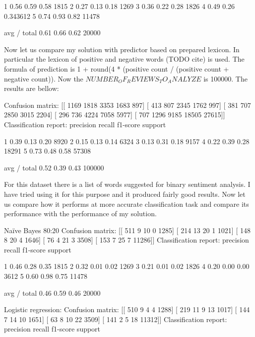 \documentclass[12pt]{report}
\begin{document}
1       0.56      0.59      0.58       1815
2       0.27      0.13      0.18       1269
3       0.36      0.22      0.28       1826
4       0.49      0.26      0.343612
5       0.74      0.93      0.82      11478

avg / total       0.61      0.66      0.62      20000

Now let us compare my solution with predictor based on prepared lexicon. In particular the lexicon of positive and negative words (TODO cite) is used. The formula of prediction is 1 + round(4 * (positive count / (positive count + negative count)). Now the $NUMBER_OF_REVIEWS_TO_ANALYZE$ is 100000. The results are bellow:



Confusion matrix:
[[ 1169  1818  3353  1683   897]
[  413   807  2345  1762   997]
[  381   707  2850  3015  2204]
[  296   736  4224  7058  5977]
[  707  1296  9185 18505 27615]]
Classification report:
precision    recall  f1-score   support

1       0.39      0.13      0.20      8920
2       0.15      0.13      0.14      6324
3       0.13      0.31      0.18      9157
4       0.22      0.39      0.28     18291
5       0.73      0.48      0.58     57308

avg / total       0.52      0.39      0.43    100000


For this dataset there is a list of words suggested for binary sentiment analysis. I have tried using it for this purpose and it produced fairly good results. Now let us compare how it performs at more accurate classification task and compare its performance with the performance of my solution.


Naïve Bayes 80:20
Confusion matrix:
[[  511     9    10     0  1285]
[  214    13    20     1  1021]
[  148     8    20     4  1646]
[   76     4    21     3  3508]
[  153     7    25     7 11286]]
Classification report:
precision    recall  f1-score   support

1       0.46      0.28      0.35      1815
2       0.32      0.01      0.02      1269
3       0.21      0.01      0.02      1826
4       0.20      0.00      0.00      3612
5       0.60      0.98      0.75     11478

avg / total       0.46      0.59      0.46     20000


Logistic regression:
Confusion matrix:
[[  510     9     4     4  1288]
[  219    11     9    13  1017]
[  144     7    14    10  1651]
[   63     8    10    22  3509]
[  141     2     5    18 11312]]
Classification report:
precision    recall  f1-score   support
\end{document}
